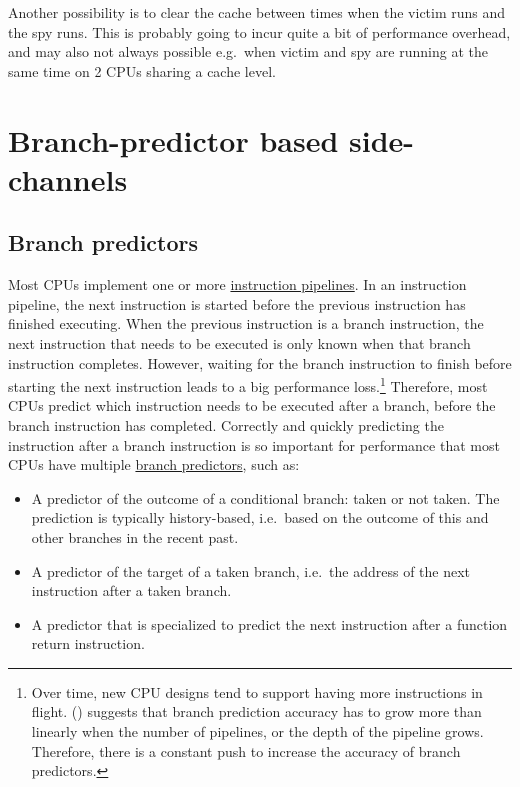 \documentclass[
  a4paper,
]{report}
\providecommand{\tightlist}{%
  \setlength{\itemsep}{0pt}\setlength{\parskip}{0pt}}
\begin{document}
Another possibility is to clear the cache between times when the victim
runs and the spy runs. This is probably going to incur quite a bit of
performance overhead, and may also not always possible e.g.~when victim
and spy are running at the same time on 2 CPUs sharing a cache level.

\section{Branch-predictor based
side-channels}\label{branch-predictor-based-side-channels}

\subsection{Branch predictors}\label{branch-predictors}

Most CPUs implement one or more
\href{https://en.wikipedia.org/wiki/Instruction_pipelining}{instruction
pipelines}.  In an
instruction pipeline, the next instruction is started before the
previous instruction has finished executing. When the previous
instruction is a branch instruction, the next instruction that needs to
be executed is only known when that branch instruction completes.
However, waiting for the branch instruction to finish before starting
the next instruction leads to a big performance loss.\footnote{Over
  time, new CPU designs tend to support having more instructions in
  flight. ()
  suggests that branch prediction accuracy has to grow more than
  linearly when the number of pipelines, or the depth of the pipeline
  grows. Therefore, there is a constant push to increase the accuracy of
  branch predictors.} Therefore, most CPUs predict which
instruction needs to be executed after a branch, before the branch
instruction has completed. Correctly and quickly predicting the
instruction after a branch instruction is so important for performance
that most CPUs have multiple
\href{https://en.wikipedia.org/wiki/Branch_predictor}{branch
predictors}, such as:

\begin{itemize}
\tightlist
\item
  A predictor of the outcome of a conditional
  branch: taken or not taken. The
  prediction is typically history-based,
  i.e.~based on the outcome of this and other branches in the recent
  past.
\item
  A predictor of the target of a taken
  branch, i.e.~the address of the next
  instruction after a taken branch.
\item
  A predictor that is specialized to predict the next instruction after
  a function return instruction.
\end{itemize}
\end{document}
